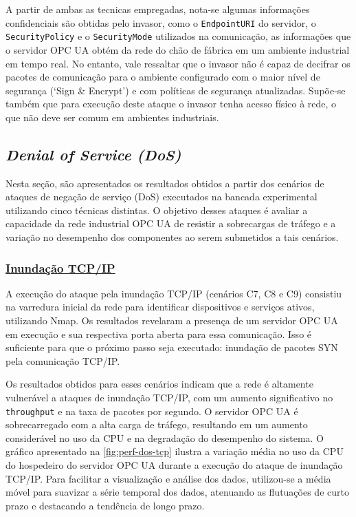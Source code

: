 A partir de ambas as tecnicas empregadas, nota-se algumas informações confidenciais são obtidas pelo invasor, como o \texttt{EndpointURI} do servidor, o \texttt{SecurityPolicy} e o \texttt{SecurityMode} utilizados na comunicação,  as informações que o servidor OPC UA obtém da rede do chão de fábrica em um ambiente industrial em tempo real. No entanto, vale ressaltar que o invasor não é capaz de decifrar os pacotes de comunicação para o ambiente configurado com o maior nível de segurança (`Sign \& Encrypt') e com políticas de segurança atualizadas. Supõe-se também que para execução deste ataque o invasor tenha acesso físico à rede, o que não deve ser comum em ambientes industriais.

\subsection{\textit{Denial of Service (DoS)}}

Nesta seção, são apresentados os resultados obtidos a partir dos cenários de ataques de negação de serviço (DoS) executados na bancada experimental utilizando cinco técnicas distintas. O objetivo desses ataques é avaliar a capacidade da rede industrial OPC UA de resistir a sobrecargas de tráfego e a variação no desempenho dos componentes ao serem submetidos a tais cenários.

\subsubsection*{\underline{Inundação TCP/IP}}

A execução do ataque pela inundação TCP/IP (cenários C7, C8 e C9) consistiu na varredura inicial da rede para identificar dispositivos e serviços ativos, utilizando Nmap. Os resultados revelaram a presença de um servidor OPC UA em execução e sua respectiva porta aberta para essa comunicação. Isso é suficiente para que o próximo passo seja executado: inundação de pacotes SYN pela comunicação TCP/IP.

Os resultados obtidos para esses cenários indicam que a rede é altamente vulnerável a ataques de inundação TCP/IP, com um aumento significativo no \texttt{throughput} e na taxa de pacotes por segundo. O servidor OPC UA é sobrecarregado com a alta carga de tráfego, resultando em um aumento considerável no uso da CPU e na degradação do desempenho do sistema. O gráfico apresentado na \autoref{fig:perf-dos-tcp} ilustra a variação média no uso da CPU do hospedeiro do servidor OPC UA durante a execução do ataque de inundação TCP/IP. Para facilitar a visualização e análise dos dados, utilizou-se a média móvel para suavizar a série temporal dos dados, atenuando as flutuações de curto prazo e destacando a tendência de longo prazo.

